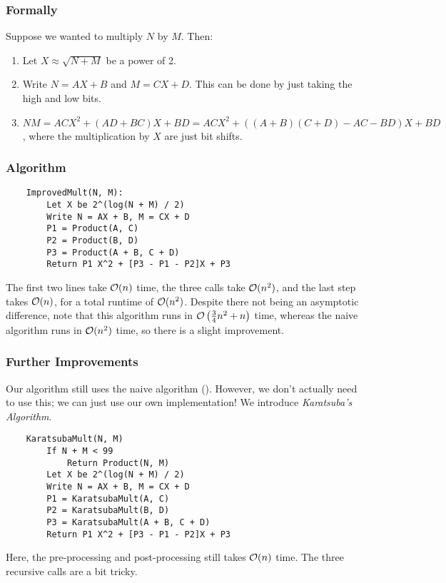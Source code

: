 \documentclass[letterpaper]{article}
\begin{document}
\subsubsection{Formally}
Suppose we wanted to multiply $N$ by $M$. Then: 
\begin{enumerate}
    \item Let $X \approx \sqrt{N + M}$ be a power of 2. 
    \item Write $N = AX + B$ and $M = CX + D$. This can be done by just taking the high and low bits. 
    \item $NM = ACX^2 + (AD + BC)X + BD = ACX^2 + ((A + B)(C + D) - AC - BD)X + BD$, where the multiplication by $X$ are just bit shifts. 
\end{enumerate}

\subsubsection{Algorithm}
\begin{verbatim}
    ImprovedMult(N, M):
        Let X be 2^(log(N + M) / 2)
        Write N = AX + B, M = CX + D 
        P1 = Product(A, C)
        P2 = Product(B, D)
        P3 = Product(A + B, C + D)
        Return P1 X^2 + [P3 - P1 - P2]X + P3
\end{verbatim}
The first two lines take $\mathcal{O}(n)$ time, the three  calls take $\mathcal{O}(n^2)$, and the last step takes $\mathcal{O}(n)$, for a total runtime of $\mathcal{O}(n^2)$. Despite there not being an asymptotic difference, note that this algorithm runs in $\mathcal{O}\left(\frac{3}{4}n^2 + n\right)$ time, whereas the naive algorithm runs in $\mathcal{O}(n^2)$ time, so there is a slight improvement. 

\subsubsection{Further Improvements}
Our algorithm still uses the naive algorithm (). However, we don't actually need to use this; we can just use our own implementation! We introduce \emph{Karatsuba's Algorithm}.

\begin{verbatim}
    KaratsubaMult(N, M)
        If N + M < 99
            Return Product(N, M)
        Let X be 2^(log(N + M) / 2)
        Write N = AX + B, M = CX + D 
        P1 = KaratsubaMult(A, C)
        P2 = KaratsubaMult(B, D)
        P3 = KaratsubaMult(A + B, C + D)
        Return P1 X^2 + [P3 - P1 - P2]X + P3
\end{verbatim}
Here, the pre-processing and post-processing still takes $\mathcal{O}(n)$ time. The three recursive calls are a bit tricky. 
\end{document}
